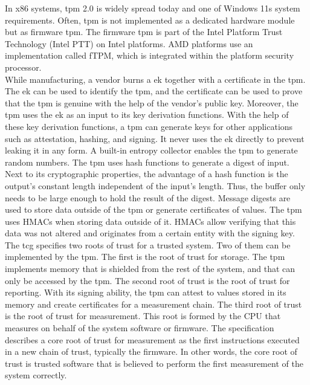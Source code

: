In x86 systems, \gls{tpm} 2.0 is widely spread today and one of Windows 11s
system requirements. Often, \gls{tpm} is not implemented as a dedicated hardware
module but as firmware \gls{tpm}. The firmware \gls{tpm} is part of the Intel
Platform Trust Technology (Intel PTT) on Intel platforms. AMD platforms use an
implementation called fTPM, which is integrated within the platform security
processor.\cite{pirker2024brief} \\

While manufacturing, a vendor burns a \gls{ek} together with a certificate in
the \gls{tpm}. The \gls{ek} can be used to identify the \gls{tpm}, and the
certificate can be used to prove that the \gls{tpm} is genuine with the help of
the vendor's public key. Moreover, the \gls{tpm} uses the \gls{ek} as an input
to its key derivation functions. With the help of these key derivation
functions, a \gls{tpm} can generate keys for other applications such as
attestation, hashing, and signing. It never uses the \gls{ek} directly to
prevent leaking it in any form. A built-in entropy collector enables the
\gls{tpm} to generate random numbers. The \gls{tpm} uses hash functions to
generate a digest of input. Next to its cryptographic properties, the advantage
of a hash function is the output's constant length independent of the input's
length. Thus, the buffer only needs to be large enough to hold the result of the
digest. Message digests are used to store data outside of the \gls{tpm} or
generate certificates of values. The \gls{tpm} uses HMACs when storing data
outside of it. HMACs allow verifying that this data was not altered and
originates from a certain entity with the signing key.\\

The \gls{tcg} specifies two roots of trust for a trusted system. Two of them can
be implemented by the \gls{tpm}. The first is the root of trust for storage. The
\gls{tpm} implements memory that is shielded from the rest of the system, and
that can only be accessed by the \gls{tpm}. The second root of trust is the root
of trust for reporting. With its signing ability, the \gls{tpm} can attest to
values stored in its memory and create certificates for a measurement chain. The
third root of trust is the root of trust for measurement. This root is formed by
the CPU that measures on behalf of the system software or firmware. The
specification describes a core root of trust for measurement as the first
instructions executed in a new chain of trust, typically the firmware. In other
words, the core root of trust is trusted software that is believed to perform
the first measurement of the system correctly.\\

